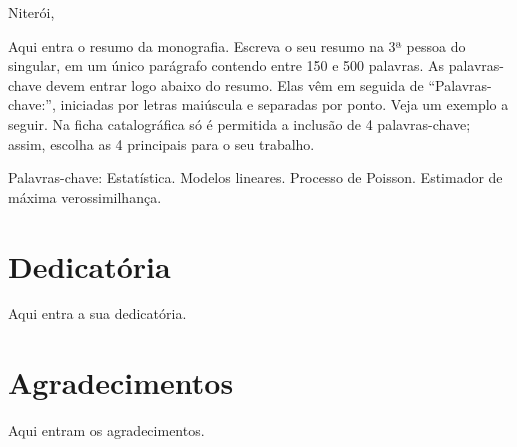 \documentclass[12pt,a4paper,header]{abnt}
\begin{document}
\begin{folhadeaprovacao}
\begin{minipage}{.7\textwidth}
\begin{flushright}
\begin{espacosimples}
\end{espacosimples}

\end{flushright}

\vspace{1.5cm}
\hfill Niterói, \ABNTdatadata

\end{minipage}

\end{folhadeaprovacao}



%

\begin{resumo}
Aqui entra o resumo da monografia. Escreva o seu resumo na 3ª pessoa do singular, em um único parágrafo contendo entre 150 e 500 palavras. As palavras-chave devem entrar logo abaixo do resumo. Elas vêm em seguida de ``Palavras-chave:'', iniciadas por letras maiúscula e separadas por ponto. Veja um exemplo a seguir. Na ficha catalográfica só é permitida a inclusão de 4 palavras-chave; assim, escolha as 4 principais para o seu trabalho.



\vspace{1cm}
\noindent Palavras-chave: Estatística. Modelos lineares. Processo de Poisson. Estimador de máxima verossimilhança.



\end{resumo}



\chapter*{Dedicatória}
Aqui entra a sua dedicatória. 



\chapter*{Agradecimentos}
Aqui entram os agradecimentos. 
\end{document}
